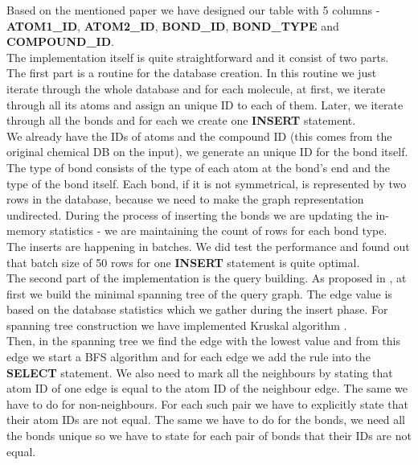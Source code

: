 {Based on the mentioned paper we have designed our table with 5 columns - \textbf{ATOM1\_ID}, \textbf{ATOM2\_ID}, \textbf{BOND\_ID}, \textbf{BOND\_TYPE} and \break \textbf{COMPOUND\_ID}.\\


The implementation itself is quite straightforward and it consist of two parts. The first part is a routine for the database creation. In this routine we just iterate through the whole database and for each molecule, at first, we iterate through all its atoms and assign an unique ID to each of them. Later, we iterate through all the bonds and for each we create one \textbf{INSERT} statement.\\

We already have the IDs of atoms and the compound ID (this comes from the original chemical DB on the input), we generate an unique ID for the bond itself. The type of bond consists of the type of each atom at the bond's end and the type of the bond itself. Each bond, if it is not symmetrical, is represented by two rows in the database, because we need to make the graph representation undirected. During the process of inserting the bonds we are updating the in-memory statistics - we are maintaining the count of rows for each bond type.\\

The inserts are happening in batches. We did test the performance and found out that batch size of 50 rows for one \textbf{INSERT} statement is quite optimal.\\

The second part of the implementation is the query building. As proposed in \cite{SQL}, at first we build the minimal spanning tree of the query graph. The edge value is based on the database statistics which we gather during the insert phase. For spanning tree construction we have implemented Kruskal algorithm \cite{kruskal}.\\

Then, in the spanning tree we find the edge with the lowest value and from this edge we start a BFS algorithm and for each edge we add the rule into the \textbf{SELECT} statement. We also need to mark all the neighbours by stating that atom ID of one edge is equal to the atom ID of the neighbour edge. The same we have to do for non-neighbours. For each such pair we have to explicitly state that their atom IDs are not equal. The same we have to do for the bonds, we need all the bonds unique so we have to state for each pair of bonds that their IDs are not equal.\\

}

